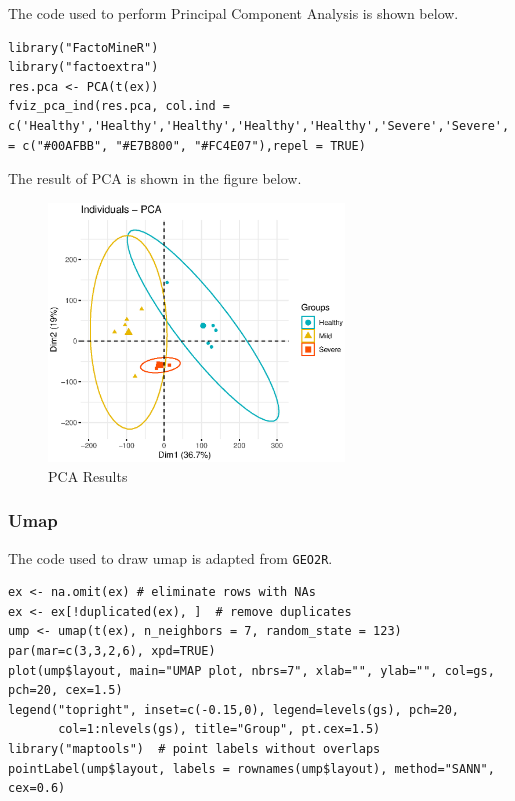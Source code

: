 \documentclass[en,black,12pt,normal]{elegantnote}
\begin{document}
The code used to perform Principal Component Analysis is shown below.

\begin{lstlisting}
library("FactoMineR")
library("factoextra")
res.pca <- PCA(t(ex))
fviz_pca_ind(res.pca, col.ind = c('Healthy','Healthy','Healthy','Healthy','Healthy','Severe','Severe','Severe','Severe','Severe','Mild','Mild','Mild','Mild','Mild'),palette = c("#00AFBB", "#E7B800", "#FC4E07"),repel = TRUE)
\end{lstlisting}

The result of PCA is shown in the figure below.
\begin{figure}[H]
    \centering
    \includegraphics[width=0.7\textwidth]{image/PCA.eps}
    \caption{PCA Results}
    \label{PCA}
\end{figure}

\subsubsection{Umap}

The code used to draw umap is adapted from \lstinline{GEO2R}.

\begin{lstlisting}
ex <- na.omit(ex) # eliminate rows with NAs
ex <- ex[!duplicated(ex), ]  # remove duplicates
ump <- umap(t(ex), n_neighbors = 7, random_state = 123)
par(mar=c(3,3,2,6), xpd=TRUE)
plot(ump$layout, main="UMAP plot, nbrs=7", xlab="", ylab="", col=gs, pch=20, cex=1.5)
legend("topright", inset=c(-0.15,0), legend=levels(gs), pch=20,
       col=1:nlevels(gs), title="Group", pt.cex=1.5)
library("maptools")  # point labels without overlaps
pointLabel(ump$layout, labels = rownames(ump$layout), method="SANN", cex=0.6)
\end{lstlisting}
\end{document}
